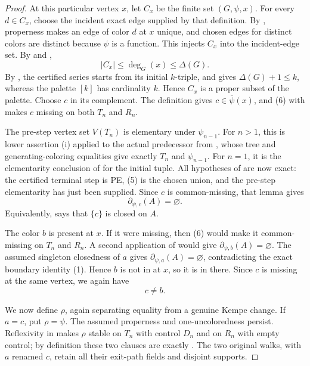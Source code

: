\begin{proof}
At this particular vertex $x$, let $C_x$ be the finite set
$(G,\psi,x)$.  For every $d\in C_x$, choose the
incident exact edge supplied by that definition.  By
, properness makes an edge of color $d$ at
$x$ unique, and chosen edges for distinct colors are distinct because
$\psi$ is a function.  This injects $C_x$ into the incident-edge set.  By
 and ,
\[
 |C_x|\leq\deg_G(x)\leq\Delta(G).
\]
By , the certified series starts from its
initial $k$-triple, and  gives
$\Delta(G)+1\leq k$, whereas the palette $[k]$ has cardinality $k$.
Hence $C_x$ is a proper subset of the palette.  Choose $c$ in its
complement.  The definition
 gives $c\in\overline\psi(x)$, and (6) with
 makes $c$ missing on both $T_n$ and $R_n$.

The pre-step vertex set $V(T_n)$ is elementary under $\psi_{n-1}$.  For
$n>1$, this is lower assertion (i) applied to the actual predecessor from
, whose tree and generating-coloring
equalities give exactly $T_n$ and $\psi_{n-1}$.  For $n=1$, it is the
elementarity conclusion of  for the
initial tuple.  All hypotheses of
 are now exact: the certified
terminal step is PE, (5) is the chosen union, and the pre-step
elementarity has just been supplied.  Since $c$ is common-missing, that
lemma gives
\[
                 \partial_{\psi,c}(A)=\varnothing.   \tag{7}
\]
Equivalently,  says that $\{c\}$ is closed
on $A$.

The color $b$ is present at $x$.  If it were missing, then (6) would make
it common-missing on $T_n$ and $R_n$.  A second application of
 would give
$\partial_{\psi,b}(A)=\varnothing$.  The assumed singleton closedness of
$a$ gives $\partial_{\psi,a}(A)=\varnothing$, contradicting the exact
boundary identity (1).  Hence $b$ is not in
 at $x$, so it is in
 there.  Since $c$ is missing at the same vertex,
we again have
\[
                         c\ne b.                    \tag{8}
\]

We now define $\rho$, again separating equality from a genuine Kempe
change.  If $a=c$, put $\rho=\psi$.  The assumed properness and
one-uncoloredness persist.  Reflexivity in  makes $\rho$
stable on $T_n$ with control $D_n$ and on $R_n$ with empty control;
by definition these two clauses are exactly
.  The two original walks, with $a$
renamed $c$, retain all their exit-path fields and disjoint supports.


\end{proof}
